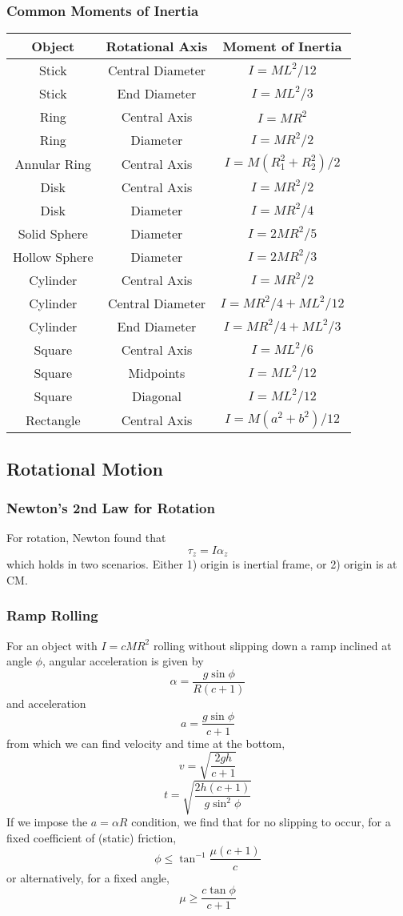 \documentclass[../PhysicsFormulae.tex]{subfiles}
\begin{document}
\subsubsection{Common Moments of Inertia}
\renewcommand{\arraystretch}{1.5}
\begin{tabular}{|c|c|c|}
\hline 
\textbf{Object} & \textbf{Rotational Axis} & \textbf{Moment of Inertia} \\ [0.5ex]
\hline \hline 
Stick & Central Diameter & $I = ML^2/12$ \\
\hline
Stick & End Diameter & $I=ML^2/3$\\
\hline
Ring & Central Axis & $I = MR^2$ \\
\hline
Ring & Diameter & $I = MR^2/2$ \\
\hline
Annular Ring & Central Axis & $I = M(R_1^2+R_2^2)/2$\\
\hline
Disk & Central Axis & $I = MR^2/2$\\
\hline
Disk & Diameter & $I = MR^2/4$\\
\hline 
Solid Sphere & Diameter & $I = 2MR^2/5$\\
\hline
Hollow Sphere & Diameter & $I = 2MR^2/3$\\
\hline 
Cylinder & Central Axis & $I = MR^2/2$\\
\hline
Cylinder & Central Diameter & $I = MR^2/4 + ML^2/12$\\
\hline 
Cylinder & End Diameter & $I = MR^2/4 + ML^2/3$\\
\hline 
Square & Central Axis & $I = ML^2/6$\\
\hline
Square & Midpoints & $I = ML^2/12$\\
\hline 
Square & Diagonal & $I = ML^2/12$\\
\hline 
Rectangle & Central Axis & $I = M(a^2 + b^2)/12$\\
\hline
\end{tabular}

\subsection{Rotational Motion}
\subsubsection{Newton's 2nd Law for Rotation}
For rotation, Newton found that
\[\tau_z = I\alpha_z\]
which holds in two scenarios. Either 1) origin is inertial frame, or 2) origin is at CM. 

\subsubsection{Ramp Rolling}
For an object with $I=cMR^2$ rolling without slipping down a ramp inclined at angle $\phi$, angular acceleration is given by
\[\alpha = \frac{g\sin{\phi}}{R(c+1)}\]
and acceleration
\[a = \frac{g\sin{\phi}}{c+1}\]
from which we can find velocity and time at the bottom,
\[v = \sqrt{\frac{2gh}{c+1}}\]
\[t = \sqrt{\frac{2h(c+1)}{g\sin^2{\phi}}}\]
If we impose the $a=\alpha R$ condition, we find that for no slipping to occur, for a fixed coefficient of (static) friction,
\[\phi \leq \tan^{-1}{{\frac{\mu (c+1)}{c}}}\]
or alternatively, for a fixed angle,
\[\mu \geq \frac{c\tan{\phi}}{c+1}\]
\end{document}
